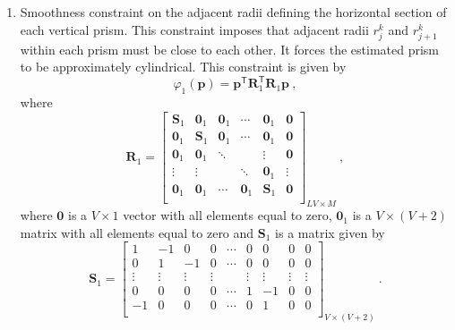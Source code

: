 \begin{enumerate}
\item Smoothness constraint on the adjacent radii defining the horizontal section of each vertical prism. This constraint imposes that adjacent 
radii $r_{j}^{k}$ and $r_{j+1}^{k}$ within each prism must be close to each other. It forces the estimated prism to be approximately cylindrical. 
This constraint is given by
\begin{equation}
\varphi_{1}(\mathbf{p}) = \mathbf{p}^\mathsf{T}\mathbf{R}^\mathsf{T}_{1}\mathbf{R}_{1}\mathbf{p} \: ,
\label{eq:phi1}
\end{equation}
where 
\begin{equation}
\mathbf{R}_{1} = 
\begin{bmatrix}
\mathbf{S}_{1} & \mathbf{0}_{1} & \mathbf{0}_{1} & \cdots         & \mathbf{0}_{1} & \mathbf{0} \\
\mathbf{0}_{1} & \mathbf{S}_{1} & \mathbf{0}_{1} & \cdots         & \mathbf{0}_{1} & \mathbf{0} \\
\mathbf{0}_{1} & \mathbf{0}_{1} & \ddots         &                & \vdots         & \mathbf{0} \\
\vdots         & \vdots         &                & \ddots         & \mathbf{0}_{1} & \vdots     \\
\mathbf{0}_{1} & \mathbf{0}_{1} & \cdots         & \mathbf{0}_{1} & \mathbf{S}_{1} & \mathbf{0} \\
\end{bmatrix}_{LV \times M} \: ,
\label{eq:R1-matrix}
\end{equation}
where $\mathbf{0}$ is a $V \times 1$ vector with all elements equal to zero, $\mathbf{0}_{1}$ is a 
$V \times (V+2)$ matrix with all elements equal to zero and $\mathbf{S}_{1}$ is a matrix given by 
\begin{equation}
\mathbf{S}_{1} = 
\begin{bmatrix}
 1      & -1     &  0     & 0      & \cdots &  0     &  0     & 0      & 0      \\
 0      &  1     & -1     & 0      & \cdots &  0     &  0     & 0      & 0      \\
\vdots  & \vdots & \vdots & \vdots &        & \vdots & \vdots & \vdots & \vdots \\
 0      &  0     &  0     & 0      & \cdots & 1      & -1     & 0      & 0      \\
-1      &  0     &  0     & 0      & \cdots & 0      &  1     & 0      & 0      \\
\end{bmatrix}_{V \times (V+2)} \: .
\label{eq:S1-matrix}
\end{equation}



\end{enumerate}
